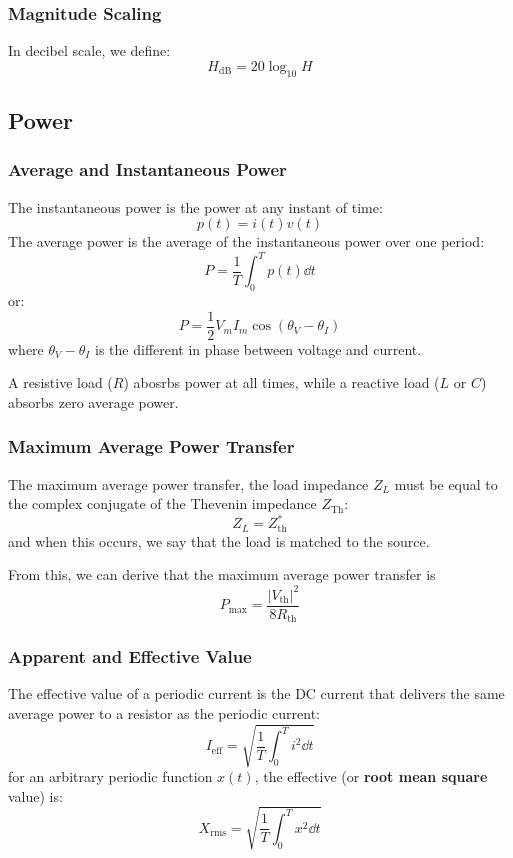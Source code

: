 \documentclass{article}
\begin{document}
\subsubsection{Magnitude Scaling}
In decibel scale, we define:
\begin{equation}
    H_\text{dB} = 20\log_{10}H
\end{equation}
\subsection{Power}
\subsubsection{Average and Instantaneous Power}
The instantaneous power is the power at any instant of time:
\begin{equation}
    p(t) = i(t)v(t)
\end{equation}
The average power is the average of the instantaneous power over one period:
\begin{equation}
    P = \frac{1}{T} \int_0^T p(t) \dd{t}
\end{equation}
or:
\begin{equation}
    P = \frac{1}{2}V_mI_m \cos(\theta_V-\theta_I)
\end{equation}
where $\theta_V-\theta_I$ is the different in phase between voltage and current.
\begin{idea}
    A resistive load ($R$) abosrbs power at all times, while a reactive load ($L$ or $C$) absorbs zero average power.
\end{idea}
\subsubsection{Maximum Average Power Transfer}
\begin{theorem}
    The maximum average power transfer, the load impedance $Z_L$ must be equal to the complex conjugate of the Thevenin impedance $Z_\text{Th}$:
    \begin{equation}
        Z_L = Z_\text{th}^*
    \end{equation}
    and when this occurs, we say that the load is matched to the source.
\end{theorem}
From this, we can derive that the maximum average power transfer is
\begin{equation}
    P_\text{max} = \frac{|V_\text{th}|^2}{8R_\text{th}}
\end{equation}
\subsubsection{Apparent and Effective Value}
The effective value of a periodic current is the DC current that delivers the same average power to a resistor as the periodic current:
\begin{equation}
    I_\text{eff} = \sqrt{\frac{1}{T}\int_0^T i^2 \dd{t}}
\end{equation}
for an arbitrary periodic function $x(t)$, the effective (or \textbf{root mean square} value) is:
\begin{equation}
    X_\text{rms} = \sqrt{\frac{1}{T}\int_0^T x^2 \dd{t}}
\end{equation}
\end{document}
